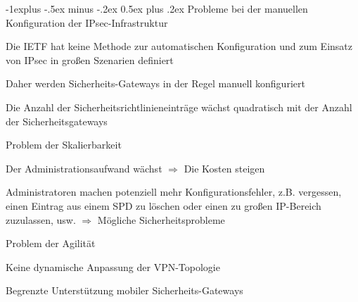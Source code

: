 \documentclass[a4paper]{article}
\makeatletter
\renewcommand{\subsection}{\@startsection{subsection}{2}{0mm}%
 {-1explus -.5ex minus -.2ex}%
 {0.5ex plus .2ex}%
 {\normalfont\normalsize\bfseries}}
\makeatother
\begin{document}
\begin{multicols}{3}
\begin{itemize*}
            \subsection{Probleme bei der manuellen Konfiguration der
                  IPsec-Infrastruktur}
            \begin{itemize*}
                  \item Die IETF hat keine Methode zur automatischen Konfiguration und zum
                  Einsatz von IPsec in großen Szenarien definiert
                  \item Daher werden Sicherheits-Gateways in der Regel manuell konfiguriert
                  \begin{itemize*}
                        \item Die Anzahl der Sicherheitsrichtlinieneinträge wächst quadratisch mit der Anzahl der Sicherheitsgateways
                        \item Problem der Skalierbarkeit
                        \begin{itemize*} \item Der Administrationsaufwand wächst $\Rightarrow$ Die Kosten steigen \item Administratoren machen potenziell mehr Konfigurationsfehler, z.B. vergessen, einen Eintrag aus einem SPD zu löschen oder einen zu großen IP-Bereich zuzulassen, usw. $\Rightarrow$ Mögliche Sicherheitsprobleme \end{itemize*}
                  \end{itemize*}
                  \item Problem der Agilität
                  \begin{itemize*}
                        \item Keine dynamische Anpassung der VPN-Topologie
                        \item Begrenzte Unterstützung mobiler Sicherheits-Gateways
                  \end{itemize*}
            \end{itemize*}


\end{itemize*}
\end{multicols}
\end{document}
